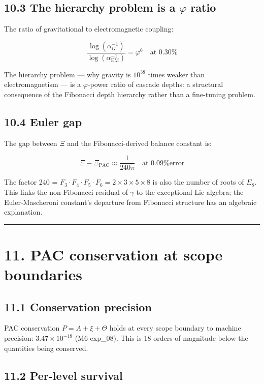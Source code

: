 \documentclass[11pt,a4paper]{article}
\begin{document}
\subsection*{10.3 The hierarchy problem is a $\varphi$ ratio}

The ratio of gravitational to electromagnetic coupling:

\[\frac{\log(\alpha_G^{-1})}{\log(\alpha_{\text{EM}}^{-1})} = \varphi^6 \quad \text{at 0.30\%}\]

The hierarchy problem — why gravity is $10^{38}$ times weaker than electromagnetism — is a $\varphi$-power ratio of cascade depths: a structural consequence of the Fibonacci depth hierarchy rather than a fine-tuning problem.

\subsection*{10.4 Euler gap}

The gap between $\Xi$ and the Fibonacci-derived balance constant is:

\[\Xi - \Xi_{\text{PAC}} \approx \frac{1}{240\pi} \quad \text{at 0.09\% error}\]

The factor 240 = $F_3 \cdot F_4 \cdot F_5 \cdot F_6 = 2 \times 3 \times 5 \times 8$ is also the number of roots of $E_8$. This links the non-Fibonacci residual of $\gamma$ to the exceptional Lie algebra; the Euler-Mascheroni constant's departure from Fibonacci structure has an algebraic explanation.

\begin{center}\rule{0.5\linewidth}{0.4pt}\end{center}

\section*{11. PAC conservation at scope boundaries}

\subsection*{11.1 Conservation precision}

PAC conservation $P = A + \xi + \Theta$ holds at every scope boundary to machine precision: $3.47 \times 10^{-18}$ (M6 exp\_08). This is 18 orders of magnitude below the quantities being conserved.

\subsection*{11.2 Per-level survival}
\end{document}
